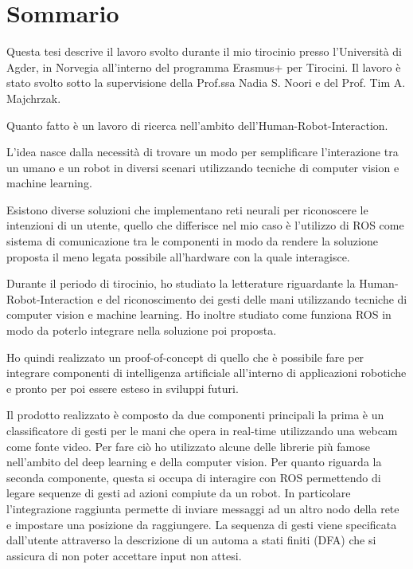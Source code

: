 \documentclass[../thesis.tex]{subfiles}
\begin{document}
    \chapter*{Sommario}
Questa tesi descrive il lavoro svolto durante il mio tirocinio presso l'Universit\`a di Agder, in Norvegia all'interno del programma Erasmus+ per Tirocini. Il lavoro è stato svolto sotto la supervisione della Prof.ssa Nadia S. Noori e del Prof. Tim A. Majchrzak.

Quanto fatto \`e un lavoro di ricerca nell'ambito dell'Human-Robot-Interaction. 

L'idea nasce dalla necessit\`a di trovare un modo per semplificare l'interazione tra un umano e un robot in diversi scenari utilizzando tecniche di computer vision e machine learning. 

Esistono diverse soluzioni che implementano reti neurali per riconoscere le intenzioni di un utente, quello che differisce nel mio caso \`e l'utilizzo di ROS come sistema di comunicazione tra le componenti in modo da rendere la soluzione proposta il meno legata possibile all'hardware con la quale interagisce. 

Durante il periodo di tirocinio, ho studiato la letterature riguardante la Human-Robot-Interaction e del riconoscimento dei gesti delle mani utilizzando tecniche di computer vision e machine learning. Ho inoltre studiato come funziona ROS in modo da poterlo integrare nella soluzione poi proposta.

Ho quindi realizzato un proof-of-concept di quello che \`e possibile fare per integrare componenti di intelligenza artificiale all'interno di applicazioni robotiche e pronto per poi essere esteso in sviluppi futuri. 

Il prodotto realizzato \`e composto da due componenti principali la prima \`e un classificatore di gesti per le mani che opera in real-time utilizzando una webcam come fonte video. Per fare ci\`o ho utilizzato alcune delle librerie pi\`u famose nell'ambito del deep learning e della computer vision. Per quanto riguarda la seconda componente, questa si occupa di interagire con ROS permettendo di legare sequenze di gesti ad azioni compiute da un robot. In particolare l'integrazione raggiunta permette di inviare messaggi ad un altro nodo della rete e impostare una posizione da raggiungere. La sequenza di gesti viene specificata dall'utente attraverso la descrizione di un automa a stati finiti (DFA) che si assicura di non poter accettare input non attesi.
\end{document}
